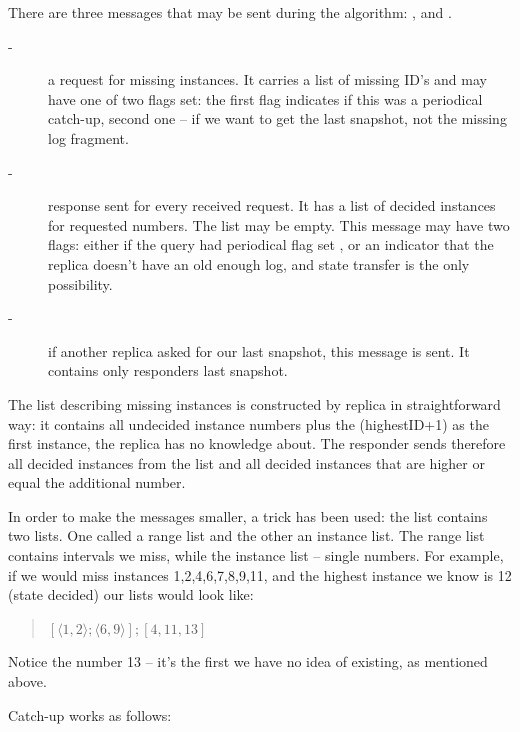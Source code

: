 There are three messages that may be sent during the algorithm: \catchUpQuery[], \catchUpResponse and \catchUpSnapshot[].
\begin{description}
 \item[\normalfont\catchUpQuery -] a request for missing instances. It carries a list of missing ID's and may have one of two flags set: the first flag indicates if this was a periodical catch-up, second one -- 
 if we want to get the last snapshot, not the missing log fragment. %
 \item[\normalfont\catchUpResponse -] response sent for every received request. It has a list of decided instances for requested numbers. The list may be empty. This message may have two flags: 
 either if the query had periodical flag set %
 , or an indicator that the replica doesn't have an old enough log, and 
 state transfer is the only possibility. %
 \item[\normalfont\catchUpSnapshot -] if another replica asked for our last snapshot, this message is sent. It contains only responders last snapshot. %
\end{description}

The list describing missing instances is constructed by replica in straightforward way: it contains all undecided instance numbers plus the (highestID+1) as the first instance, the replica has no knowledge about. The responder sends therefore all decided instances from the list and all decided instances that are higher or equal the additional number.

In order to make the messages smaller, a trick has been used: the list contains two lists. One called a range list and the other an instance list.
The range list contains intervals we miss, while the instance list -- single numbers. For example, if we would miss instances 1,2,4,6,7,8,9,11, and the highest instance we know is 12 (state decided) our lists would look like:
\begin{quote}
$[\langle1,2\rangle; \langle6,9\rangle]; [4,11,13]$
\end{quote} 
Notice the number 13 -- it's the first we have no idea of existing, as mentioned above.

Catch-up works as follows:

